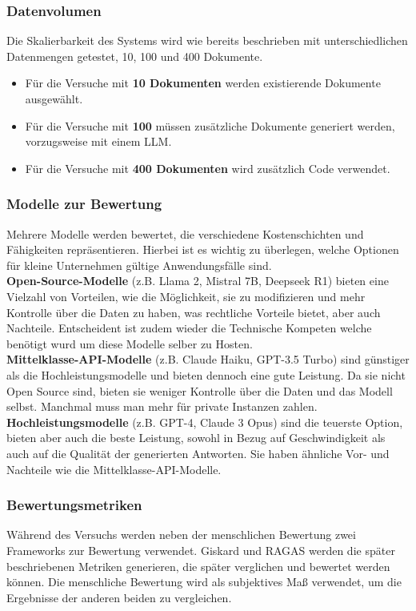 \subsubsection{Datenvolumen}
Die Skalierbarkeit des Systems wird wie bereits beschrieben mit unterschiedlichen Datenmengen getestet, 10, 100 und 400 Dokumente.
\begin{itemize}
    \item Für die Versuche mit \textbf{10 Dokumenten} werden existierende Dokumente ausgewählt.
    \item Für die Versuche mit \textbf{100} müssen zusätzliche Dokumente generiert werden, vorzugsweise mit einem LLM.
    \item Für die Versuche mit \textbf{400 Dokumenten} wird zusätzlich Code verwendet.
\end{itemize}

\subsubsection{Modelle zur Bewertung}
Mehrere Modelle werden bewertet, die verschiedene Kostenschichten und Fähigkeiten repräsentieren. Hierbei ist es wichtig zu überlegen, welche Optionen für kleine Unternehmen gültige Anwendungsfälle sind.\\
\textbf{Open-Source-Modelle} (z.B. Llama 2, Mistral 7B, Deepseek R1) bieten eine Vielzahl von Vorteilen, wie die Möglichkeit, sie zu modifizieren und mehr Kontrolle über die Daten zu haben, was rechtliche Vorteile bietet, aber auch Nachteile. Entscheident ist zudem wieder die Technische Kompeten welche benötigt wurd um diese Modelle selber zu Hosten.\\
\textbf{Mittelklasse-API-Modelle} (z.B. Claude Haiku, GPT-3.5 Turbo) sind günstiger als die Hochleistungsmodelle und bieten dennoch eine gute Leistung. Da sie nicht Open Source sind, bieten sie weniger Kontrolle über die Daten und das Modell selbst. Manchmal muss man mehr für private Instanzen zahlen.\\
\textbf{Hochleistungsmodelle} (z.B. GPT-4, Claude 3 Opus) sind die teuerste Option, bieten aber auch die beste Leistung, sowohl in Bezug auf Geschwindigkeit als auch auf die Qualität der generierten Antworten. Sie haben ähnliche Vor- und Nachteile wie die Mittelklasse-API-Modelle.\\

\subsubsection{Bewertungsmetriken}
Während des Versuchs werden neben der menschlichen Bewertung zwei Frameworks zur Bewertung verwendet.
Giskard und RAGAS werden die später beschriebenen Metriken generieren, die später verglichen und bewertet werden können.
Die menschliche Bewertung wird als subjektives Maß verwendet, um die Ergebnisse der anderen beiden zu vergleichen.

